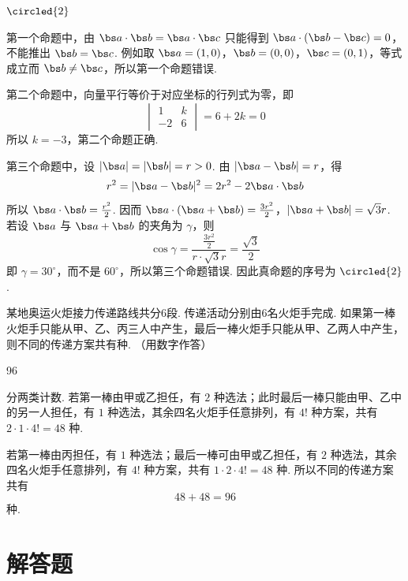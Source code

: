 \begin{answer}
\(\circled{2}\)
\end{answer}

\begin{solution}
第一个命题中，由 \(\bs a\cdot\bs b=\bs a\cdot\bs c\) 只能得到 \(\bs a\cdot(\bs b-\bs c)=0\)，不能推出 \(\bs b=\bs c\). 例如取 \(\bs a=(1,0)\)，\(\bs b=(0,0)\)，\(\bs c=(0,1)\)，等式成立而 \(\bs b\neq\bs c\)，所以第一个命题错误.

第二个命题中，向量平行等价于对应坐标的行列式为零，即
\[
\begin{vmatrix}1&k\\-2&6\end{vmatrix}=6+2k=0
\]
所以 \(k=-3\)，第二个命题正确.

第三个命题中，设 \(|\bs a|=|\bs b|=r>0\). 由 \(|\bs a-\bs b|=r\)，得
\[
r^2=|\bs a-\bs b|^2=2r^2-2\bs a\cdot\bs b
\]
所以 \(\bs a\cdot\bs b=\frac{r^2}{2}\). 因而
\(\bs a\cdot(\bs a+\bs b)=\frac{3r^2}{2}\)，\(|\bs a+\bs b|=\sqrt{3}r\).
若设 \(\bs a\) 与 \(\bs a+\bs b\) 的夹角为 \(\gamma\)，则
\[
\cos\gamma=\frac{\frac{3r^2}{2}}{r\cdot\sqrt3r}=\frac{\sqrt3}{2}
\]
即 \(\gamma=30^{\circ}\)，而不是 \(60^{\circ}\)，所以第三个命题错误. 因此真命题的序号为 \(\circled{2}\).
\end{solution}

\begin{problem}
某地奥运火炬接力传递路线共分\(6\)段. 传递活动分别由\(6\)名火炬手完成. 如果第一棒火炬手只能从甲、乙、丙三人中产生，最后一棒火炬手只能从甲、乙两人中产生，则不同的传递方案共有\fillinblank{}种. （用数字作答）
\end{problem}

\begin{answer}
96
\end{answer}

\begin{solution}
分两类计数. 若第一棒由甲或乙担任，有 \(2\) 种选法；此时最后一棒只能由甲、乙中的另一人担任，有 \(1\) 种选法，其余四名火炬手任意排列，有 \(4!\) 种方案，共有 \(2\cdot1\cdot4!=48\) 种.

若第一棒由丙担任，有 \(1\) 种选法；最后一棒可由甲或乙担任，有 \(2\) 种选法，其余四名火炬手任意排列，有 \(4!\) 种方案，共有 \(1\cdot2\cdot4!=48\) 种. 所以不同的传递方案共有
\[
48+48=96
\]
种.
\end{solution}

\section{解答题}

